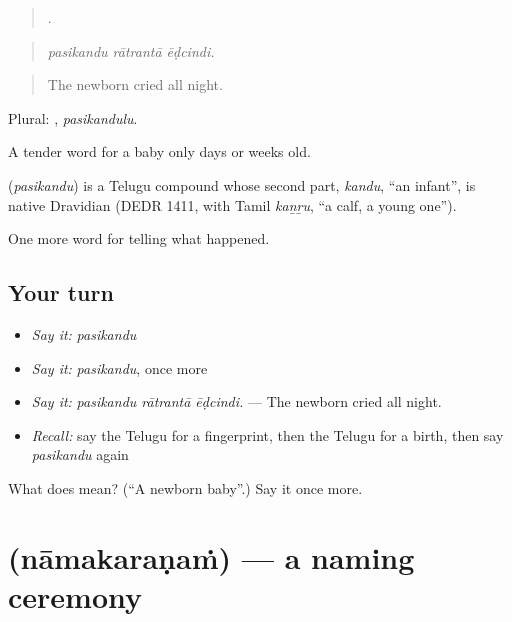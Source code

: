 \begin{quote}
  .
\end{quote}

\begin{quote}
\emph{pasikandu rātrantā ēḍcindi.}
\end{quote}

\begin{quote}
The newborn cried all night.
\end{quote}

Plural: , \emph{pasikandulu}.

A tender word for a baby only days or weeks old.

\begin{cousinweb}
\textbf{} (\emph{pasikandu}) is a Telugu compound whose second part, \emph{kandu}, \textquotedblleft{}an infant\textquotedblright{}, is native Dravidian (DEDR 1411, with Tamil \emph{kaṉṟu}, \textquotedblleft{}a calf, a young one\textquotedblright{}).
\end{cousinweb}

\begin{grammarlens}[title={What you've built}]
One more word for telling what happened.
\end{grammarlens}

\subsection*{Your turn}
\begin{itemize}
\raggedright
  \item \emph{Say it:} \emph{pasikandu}
  \item \emph{Say it:} \emph{pasikandu}, once more
  \item \emph{Say it:} \emph{pasikandu rātrantā ēḍcindi.} — The newborn cried all night.
  \item \emph{Recall:} say the Telugu for a fingerprint, then the Telugu for a birth, then say \emph{pasikandu} again
\end{itemize}

\begin{tcolorbox}[breakable,colback=teal!4,colframe=teal!35!black,title={Before you move on}]
What does  mean? (\textquotedblleft{}A newborn baby\textquotedblright{}.) Say it once more.
\end{tcolorbox}
\section[\texorpdfstring{\te{నామకరణం} (nāmakaraṇaṁ)}{నామకరణం (nāmakaraṇaṁ)}]{ (nāmakaraṇaṁ) — a naming ceremony}

